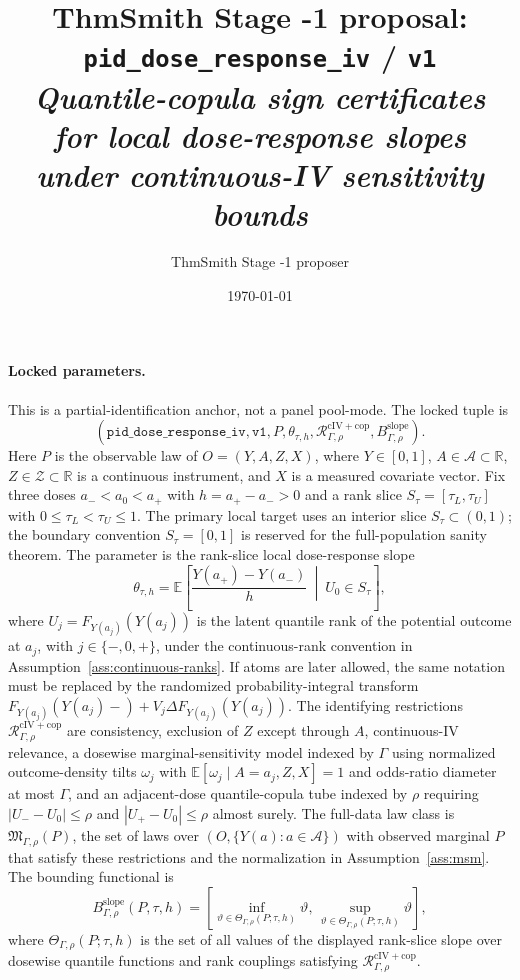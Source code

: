 \documentclass[11pt]{article}
\title{ThmSmith Stage -1 proposal: \texttt{pid\_dose\_response\_iv} / \texttt{v1}%
  \\ \large\textit{Quantile-copula sign certificates for local dose-response slopes under continuous-IV sensitivity bounds}}
\author{ThmSmith Stage -1 proposer}
\date{\today}
\newcommand{\E}{\mathbb{E}}
\theoremstyle{definition}
\theoremstyle{plain}
\theoremstyle{remark}
\begin{document}
\maketitle


\paragraph{Locked parameters.}
This is a partial-identification anchor, not a panel pool-mode.  The locked tuple is
\[
(\texttt{pid\_dose\_response\_iv},\texttt{v1},
P,\theta_{\tau,h},\mathcal R_{\Gamma,\rho}^{\mathrm{cIV+cop}},
B_{\Gamma,\rho}^{\mathrm{slope}}).
\]
Here \(P\) is the observable law of \(O=(Y,A,Z,X)\), where \(Y\in[0,1]\), \(A\in\mathcal A\subset\mathbb R\), \(Z\in\mathcal Z\subset\mathbb R\) is a continuous instrument, and \(X\) is a measured covariate vector.  Fix three doses \(a_-<a_0<a_+\) with \(h=a_+-a_->0\) and a rank slice \(S_\tau=[\tau_L,\tau_U]\) with \(0\le \tau_L<\tau_U\le 1\).  The primary local target uses an interior slice \(S_\tau\subset(0,1)\); the boundary convention \(S_\tau=[0,1]\) is reserved for the full-population sanity theorem.  The parameter is the rank-slice local dose-response slope
\[
\theta_{\tau,h}
=\E\!\left[\frac{Y(a_+)-Y(a_-)}{h}\ \middle|\ U_0\in S_\tau\right],
\]
where \(U_j=F_{Y(a_j)}(Y(a_j))\) is the latent quantile rank of the potential outcome at \(a_j\), with \(j\in\{-,0,+\}\), under the continuous-rank convention in Assumption~\ref{ass:continuous-ranks}.  If atoms are later allowed, the same notation must be replaced by the randomized probability-integral transform \(F_{Y(a_j)}(Y(a_j)-)+V_j\Delta F_{Y(a_j)}(Y(a_j))\).  The identifying restrictions \(\mathcal R_{\Gamma,\rho}^{\mathrm{cIV+cop}}\) are consistency, exclusion of \(Z\) except through \(A\), continuous-IV relevance, a dosewise marginal-sensitivity model indexed by \(\Gamma\) using normalized outcome-density tilts \(\omega_j\) with \(\E[\omega_j\mid A=a_j,Z,X]=1\) and odds-ratio diameter at most \(\Gamma\), and an adjacent-dose quantile-copula tube indexed by \(\rho\) requiring \(|U_--U_0|\le\rho\) and \(|U_+-U_0|\le\rho\) almost surely.  The full-data law class is \(\mathfrak M_{\Gamma,\rho}(P)\), the set of laws over \((O,\{Y(a):a\in\mathcal A\})\) with observed marginal \(P\) that satisfy these restrictions and the normalization in Assumption~\ref{ass:msm}.  The bounding functional is
\[
B_{\Gamma,\rho}^{\mathrm{slope}}(P,\tau,h)
=\left[
\inf_{\vartheta\in\Theta_{\Gamma,\rho}(P;\tau,h)}\vartheta,\,
\sup_{\vartheta\in\Theta_{\Gamma,\rho}(P;\tau,h)}\vartheta
\right],
\]
where \(\Theta_{\Gamma,\rho}(P;\tau,h)\) is the set of all values of the displayed rank-slice slope over dosewise quantile functions and rank couplings satisfying \(\mathcal R_{\Gamma,\rho}^{\mathrm{cIV+cop}}\).
\end{document}
